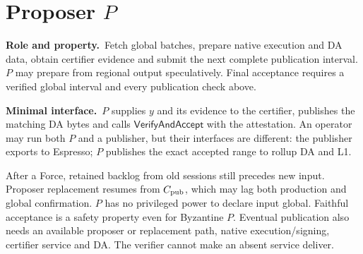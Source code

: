\documentclass[11pt,a4paper]{article}
\newcommand{\api}[1]{\ensuremath{\mathsf{#1}}}
\newcommand{\role}{\textbf{Role and property.}\ }
\newcommand{\iface}{\textbf{Minimal interface.}\ }
\begin{document}
\section{Proposer \texorpdfstring{$P$}{P}}\label{sec:proposer}
\role Fetch global batches, prepare native execution and DA data, obtain
certifier evidence and submit the next complete publication interval.
$P$ may prepare from regional output speculatively. Final acceptance
requires a verified global interval and every publication check above.

\iface $P$ supplies $y$ and its evidence to the certifier, publishes the
matching DA bytes and calls \api{VerifyAndAccept} with the attestation.
An operator may run both $P$ and a publisher, but their interfaces are
different: the publisher exports to Espresso; $P$ publishes the exact
accepted range to rollup DA and L1.

After a Force, retained backlog from old sessions still precedes new
input. Proposer replacement resumes from $C_{\rm pub}$, which may lag
both production and global confirmation. $P$ has no privileged power
to declare input global. Faithful acceptance is a safety property even
for Byzantine $P$. Eventual publication also needs an available proposer
or replacement path, native execution/signing, certifier service and DA.
The verifier cannot make an absent service deliver.

\clearpage
\end{document}
